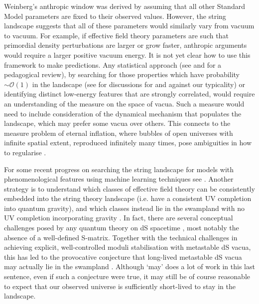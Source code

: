 Weinberg's anthropic window was derived by assuming that all other Standard Model parameters are fixed to their observed values. However, the string landscape suggests that all of these parameters would similarly vary from vacuum to vacuum.  For example, if effective field theory parameters are such that primordial density perturbations are larger or grow faster, anthropic arguments would require a larger positive vacuum energy. It is not yet clear how to use this framework to make predictions. Any statistical approach (see \cite{Denef:2004ze, Douglas:2003um, Broeckel:2020fdz, Broeckel:2021dpz, Cicoli:2022chj} and \cite{Kumar:2006tn} for a pedagogical review), by searching for those properties which have probability $\sim\mathcal{O}(1)$ in the landscape (see \cite{Page:2007bt, Hartle:2007zv} for discussions for and against our typicality) or identifying distinct low-energy features that are strongly correlated, would require an understanding of the measure on the space of vacua. Such a measure would need to include consideration of the dynamical mechanism that populates the landscape, which may prefer some vacua over others. This connects to the measure problem of eternal inflation, where bubbles of open universes with infinite spatial extent, reproduced infinitely many times, pose ambiguities in how to regularise \cite{Linde:1993xx, Guth:2000ka}.  

For some recent progress on searching the string landscape for models with phenomenological features using machine learning techniques see \cite{Cole:2021nnt}. Another strategy is to understand which classes of effective field theory can be consistently embedded into the string theory landscape (i.e. have a consistent UV completion into quantum gravity), and which classes instead lie in the swampland with no UV completion incorporating gravity \cite{Vafa:2005ui}. In fact, there are several conceptual challenges posed by any quantum theory on dS spacetime \cite{Witten:2001kn, Banks:2012hx, Maltz:2016iaw, Dvali:2018jhn}, most notably the absence of a well-defined S-matrix. Together with the technical challenges in achieving explicit, well-controlled moduli stabilisation with metastable dS vacua, this has led to the provocative conjecture that long-lived metastable dS vacua may actually lie in the swampland \cite{Garg:2018reu,Ooguri:2018wrx}. Although `may' does a lot of work in this last sentence, even if such a conjecture were true, it may still be of course reasonable to expect that our observed universe is sufficiently short-lived to stay in the landscape.

